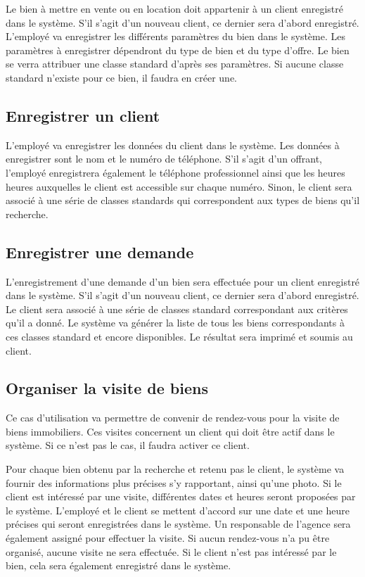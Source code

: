 Le bien à mettre en vente ou en location doit appartenir à un client enregistré dans le système. S'il s'agit d'un nouveau client, ce dernier sera d'abord enregistré. L'employé va enregistrer les différents paramètres du bien dans le système. Les paramètres à enregistrer dépendront du type de bien et du type d'offre. Le bien se verra attribuer une classe standard d'après ses paramètres. Si aucune classe standard n'existe pour ce bien, il faudra en créer une.

\subsection{Enregistrer un client}

L'employé va enregistrer les données du client dans le système. Les données à enregistrer sont le nom et le numéro de téléphone. S'il s'agit d'un offrant, l'employé enregistrera également le téléphone professionnel ainsi que les heures heures auxquelles le client est accessible sur chaque numéro. Sinon, le client sera associé à une série de classes standards qui correspondent aux types de biens qu'il recherche.

\subsection{Enregistrer une demande}

L'enregistrement d'une demande d'un bien sera effectuée pour un client enregistré dans le système. S'il s'agit d'un nouveau client, ce dernier sera d'abord enregistré. Le client sera associé à une série de classes standard correspondant aux critères qu'il a donné. Le système va générer la liste de tous les biens correspondants à ces classes standard et encore disponibles. Le résultat sera imprimé et soumis au client.

\subsection{Organiser la visite de biens}

Ce cas d'utilisation va permettre de convenir de rendez-vous pour la visite de biens immobiliers. Ces visites concernent un client qui doit être actif dans le système. Si ce n'est pas le cas, il faudra activer ce client.

Pour chaque bien obtenu par la recherche et retenu pas le client, le système va fournir des informations plus précises s'y rapportant, ainsi qu'une photo. Si le client est intéressé par une visite, différentes dates et heures seront proposées par le système. L'employé et le client se mettent d'accord sur une date et une heure précises qui seront enregistrées dans le système. Un responsable de l'agence sera également assigné pour effectuer la visite. Si aucun rendez-vous n'a pu être organisé, aucune visite ne sera effectuée. Si le client n'est pas intéressé par le bien, cela sera également enregistré dans le système.

